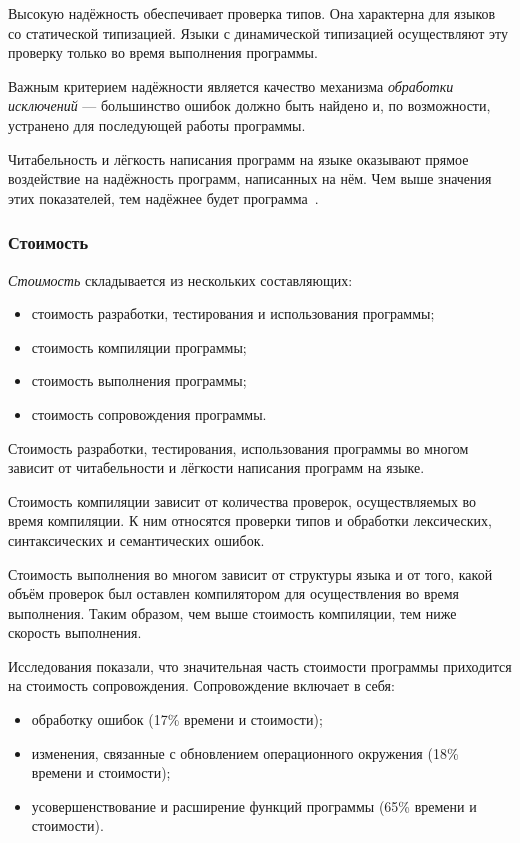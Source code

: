            Высокую надёжность обеспечивает проверка типов.
            Она характерна для языков со статической типизацией.
            Языки с динамической типизацией осуществляют эту проверку только во время выполнения программы.

            Важным критерием надёжности является качество механизма \textit{обработки исключений} --- большинство ошибок должно быть найдено и, по возможности, устранено для последующей работы программы.

            Читабельность и лёгкость написания программ на языке оказывают прямое воздействие на надёжность программ, написанных на нём.
            Чем выше значения этих показателей, тем надёжнее будет программа~\cite{langs}.
        \subsubsection{Стоимость}
            \textit{Стоимость} складывается из нескольких составляющих:
            \begin{itemize}
                \item стоимость разработки, тестирования и использования программы;
                \item стоимость компиляции программы;
                \item стоимость выполнения программы;
                \item стоимость сопровождения программы.
            \end{itemize}

            Стоимость разработки, тестирования, использования программы во многом зависит от читабельности и лёгкости написания программ на языке.

            Стоимость компиляции зависит от количества проверок, осуществляемых во время компиляции.
            К ним относятся проверки типов и обработки лексических, синтаксических и семантических ошибок.

            Стоимость выполнения во многом зависит от структуры языка и от того, какой объём проверок был оставлен компилятором для осуществления во время выполнения.
            Таким образом, чем выше стоимость компиляции, тем ниже скорость выполнения.

            Исследования показали\cite{langs}, что значительная часть стоимости программы приходится на стоимость сопровождения.
            Сопровождение включает в себя:
            \begin{itemize}
                \item обработку ошибок (17\% времени и стоимости);
                \item изменения, связанные с обновлением операционного окружения (18\% времени и стоимости);
                \item усовершенствование и расширение функций программы (65\% времени и стоимости).
            \end{itemize}

